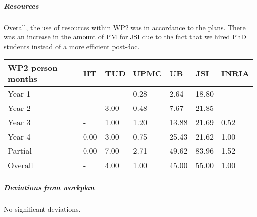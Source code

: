 \subparagraph*{Resources}
Overall, the use of resources within WP2 was in accordance to the plans. There was an increase in the amount of PM for JSI due to the fact that we hired PhD students instead of a more efficient post-doc.
\begin{center}
\begin{tabular}{|C{1.5cm}|C{1.5cm}|C{1.5cm}|C{2cm}|C{2cm}|C{2cm}|C{2cm}|}
\hline
\footnotesize \textbf{WP2 person months}& \footnotesize \textbf{IIT}&\footnotesize \textbf{TUD}&\footnotesize \textbf{UPMC}& \footnotesize \textbf{UB} &\footnotesize \textbf{JSI} & \footnotesize \textbf{INRIA} \\ \hline
\footnotesize Year 1  &  -     & -    & 0.28 & 2.64  & 18.80  & -     \\  \hline
\footnotesize Year 2  &  -     & 3.00 & 0.48 & 7.67  & 21.85  & -     \\  \hline
\footnotesize Year 3  &  -     & 1.00 & 1.20 & 13.88 & 21.69  & 0.52  \\  \hline
\footnotesize Year 4  &  0.00  &  3.00 &  0.75 &  25.43 &  21.62 &  1.00  \\  \hline 
\footnotesize Partial & 0.00 &  7.00 &  2.71 &  49.62 &  83.96 &  1.52     \\
\hline \hline
\footnotesize Overall & -      & 4.00 & 1.00 & 45.00  & 55.00 & 1.00  \\  \hline
\end{tabular}
\end{center}

\subparagraph*{Deviations from workplan} 
No significant deviations.
